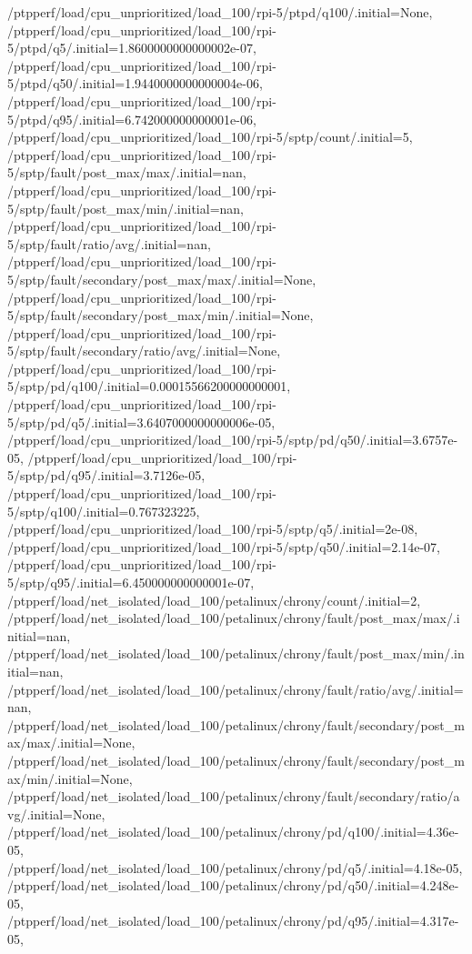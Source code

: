 {    /ptpperf/load/cpu_unprioritized/load_100/rpi-5/ptpd/q100/.initial=None,
    /ptpperf/load/cpu_unprioritized/load_100/rpi-5/ptpd/q5/.initial=1.8600000000000002e-07,
    /ptpperf/load/cpu_unprioritized/load_100/rpi-5/ptpd/q50/.initial=1.9440000000000004e-06,
    /ptpperf/load/cpu_unprioritized/load_100/rpi-5/ptpd/q95/.initial=6.742000000000001e-06,
    /ptpperf/load/cpu_unprioritized/load_100/rpi-5/sptp/count/.initial=5,
    /ptpperf/load/cpu_unprioritized/load_100/rpi-5/sptp/fault/post_max/max/.initial=nan,
    /ptpperf/load/cpu_unprioritized/load_100/rpi-5/sptp/fault/post_max/min/.initial=nan,
    /ptpperf/load/cpu_unprioritized/load_100/rpi-5/sptp/fault/ratio/avg/.initial=nan,
    /ptpperf/load/cpu_unprioritized/load_100/rpi-5/sptp/fault/secondary/post_max/max/.initial=None,
    /ptpperf/load/cpu_unprioritized/load_100/rpi-5/sptp/fault/secondary/post_max/min/.initial=None,
    /ptpperf/load/cpu_unprioritized/load_100/rpi-5/sptp/fault/secondary/ratio/avg/.initial=None,
    /ptpperf/load/cpu_unprioritized/load_100/rpi-5/sptp/pd/q100/.initial=0.00015566200000000001,
    /ptpperf/load/cpu_unprioritized/load_100/rpi-5/sptp/pd/q5/.initial=3.6407000000000006e-05,
    /ptpperf/load/cpu_unprioritized/load_100/rpi-5/sptp/pd/q50/.initial=3.6757e-05,
    /ptpperf/load/cpu_unprioritized/load_100/rpi-5/sptp/pd/q95/.initial=3.7126e-05,
    /ptpperf/load/cpu_unprioritized/load_100/rpi-5/sptp/q100/.initial=0.767323225,
    /ptpperf/load/cpu_unprioritized/load_100/rpi-5/sptp/q5/.initial=2e-08,
    /ptpperf/load/cpu_unprioritized/load_100/rpi-5/sptp/q50/.initial=2.14e-07,
    /ptpperf/load/cpu_unprioritized/load_100/rpi-5/sptp/q95/.initial=6.450000000000001e-07,
    /ptpperf/load/net_isolated/load_100/petalinux/chrony/count/.initial=2,
    /ptpperf/load/net_isolated/load_100/petalinux/chrony/fault/post_max/max/.initial=nan,
    /ptpperf/load/net_isolated/load_100/petalinux/chrony/fault/post_max/min/.initial=nan,
    /ptpperf/load/net_isolated/load_100/petalinux/chrony/fault/ratio/avg/.initial=nan,
    /ptpperf/load/net_isolated/load_100/petalinux/chrony/fault/secondary/post_max/max/.initial=None,
    /ptpperf/load/net_isolated/load_100/petalinux/chrony/fault/secondary/post_max/min/.initial=None,
    /ptpperf/load/net_isolated/load_100/petalinux/chrony/fault/secondary/ratio/avg/.initial=None,
    /ptpperf/load/net_isolated/load_100/petalinux/chrony/pd/q100/.initial=4.36e-05,
    /ptpperf/load/net_isolated/load_100/petalinux/chrony/pd/q5/.initial=4.18e-05,
    /ptpperf/load/net_isolated/load_100/petalinux/chrony/pd/q50/.initial=4.248e-05,
    /ptpperf/load/net_isolated/load_100/petalinux/chrony/pd/q95/.initial=4.317e-05,
}
